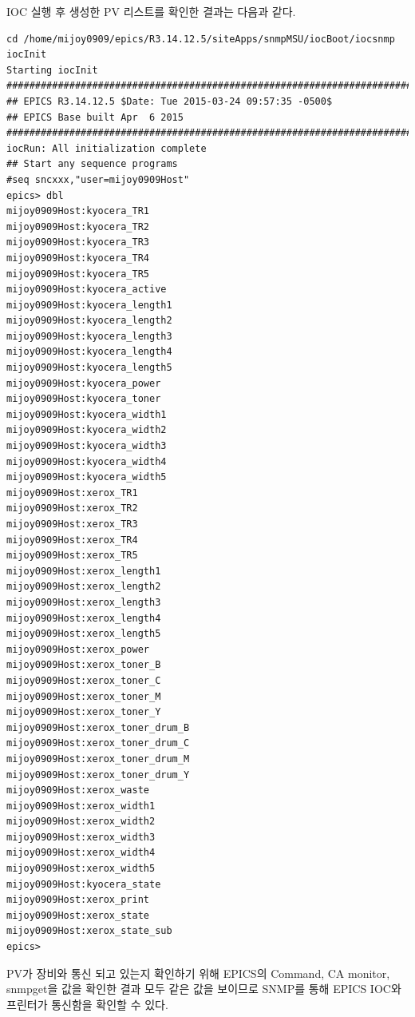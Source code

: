 \documentclass[11pt
  , a4paper
  , article
  , oneside
]{memoir}
\begin{document}
\hfill

IOC 실행 후 생성한 PV 리스트를 확인한 결과는 다음과 같다. 

{\scriptsize
\begin{lstlisting}[style=termstyle]
cd /home/mijoy0909/epics/R3.14.12.5/siteApps/snmpMSU/iocBoot/iocsnmp
iocInit
Starting iocInit
############################################################################
## EPICS R3.14.12.5 $Date: Tue 2015-03-24 09:57:35 -0500$
## EPICS Base built Apr  6 2015
############################################################################
iocRun: All initialization complete
## Start any sequence programs
#seq sncxxx,"user=mijoy0909Host"
epics> dbl
mijoy0909Host:kyocera_TR1
mijoy0909Host:kyocera_TR2
mijoy0909Host:kyocera_TR3
mijoy0909Host:kyocera_TR4
mijoy0909Host:kyocera_TR5
mijoy0909Host:kyocera_active
mijoy0909Host:kyocera_length1
mijoy0909Host:kyocera_length2
mijoy0909Host:kyocera_length3
mijoy0909Host:kyocera_length4
mijoy0909Host:kyocera_length5
mijoy0909Host:kyocera_power
mijoy0909Host:kyocera_toner
mijoy0909Host:kyocera_width1
mijoy0909Host:kyocera_width2
mijoy0909Host:kyocera_width3
mijoy0909Host:kyocera_width4
mijoy0909Host:kyocera_width5
mijoy0909Host:xerox_TR1
mijoy0909Host:xerox_TR2
mijoy0909Host:xerox_TR3
mijoy0909Host:xerox_TR4
mijoy0909Host:xerox_TR5
mijoy0909Host:xerox_length1
mijoy0909Host:xerox_length2
mijoy0909Host:xerox_length3
mijoy0909Host:xerox_length4
mijoy0909Host:xerox_length5
mijoy0909Host:xerox_power
mijoy0909Host:xerox_toner_B
mijoy0909Host:xerox_toner_C
mijoy0909Host:xerox_toner_M
mijoy0909Host:xerox_toner_Y
mijoy0909Host:xerox_toner_drum_B
mijoy0909Host:xerox_toner_drum_C
mijoy0909Host:xerox_toner_drum_M
mijoy0909Host:xerox_toner_drum_Y
mijoy0909Host:xerox_waste
mijoy0909Host:xerox_width1
mijoy0909Host:xerox_width2
mijoy0909Host:xerox_width3
mijoy0909Host:xerox_width4
mijoy0909Host:xerox_width5
mijoy0909Host:kyocera_state
mijoy0909Host:xerox_print
mijoy0909Host:xerox_state
mijoy0909Host:xerox_state_sub
epics> 
\end{lstlisting}
}

\hfill

PV가 장비와 통신 되고 있는지 확인하기 위해 EPICS의 Command, CA monitor, snmpget을 값을 확인한 결과 모두 같은 값을 보이므로  SNMP를 통해 EPICS IOC와 프린터가 통신함을 확인할 수 있다.  
\end{document}
